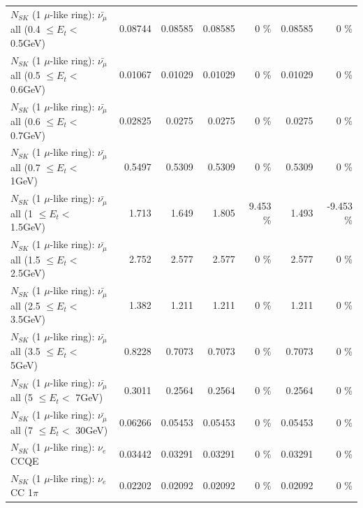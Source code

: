 \begin{table}
\begin{tabular}{| l | r | r | r  r | r  r |}
 $N_{SK}$ (1 $\mu$-like ring): $\bar{\nu_{\mu}}$ all (0.4 $\leq E_{t} <$ 0.5GeV) &         0.08744 &         0.08585 &         0.08585 &        0 \%  &         0.08585 &        0 \%  \\ 
 $N_{SK}$ (1 $\mu$-like ring): $\bar{\nu_{\mu}}$ all (0.5 $\leq E_{t} <$ 0.6GeV) &         0.01067 &         0.01029 &         0.01029 &        0 \%  &         0.01029 &        0 \%  \\ 
 $N_{SK}$ (1 $\mu$-like ring): $\bar{\nu_{\mu}}$ all (0.6 $\leq E_{t} <$ 0.7GeV) &         0.02825 &          0.0275 &          0.0275 &        0 \%  &          0.0275 &        0 \%  \\ 
   $N_{SK}$ (1 $\mu$-like ring): $\bar{\nu_{\mu}}$ all (0.7 $\leq E_{t} <$ 1GeV) &          0.5497 &          0.5309 &          0.5309 &        0 \%  &          0.5309 &        0 \%  \\ 
   $N_{SK}$ (1 $\mu$-like ring): $\bar{\nu_{\mu}}$ all (1 $\leq E_{t} <$ 1.5GeV) &           1.713 &           1.649 &           1.805 &    9.453 \%  &           1.493 &   -9.453 \%  \\ 
 $N_{SK}$ (1 $\mu$-like ring): $\bar{\nu_{\mu}}$ all (1.5 $\leq E_{t} <$ 2.5GeV) &           2.752 &           2.577 &           2.577 &        0 \%  &           2.577 &        0 \%  \\ 
 $N_{SK}$ (1 $\mu$-like ring): $\bar{\nu_{\mu}}$ all (2.5 $\leq E_{t} <$ 3.5GeV) &           1.382 &           1.211 &           1.211 &        0 \%  &           1.211 &        0 \%  \\ 
   $N_{SK}$ (1 $\mu$-like ring): $\bar{\nu_{\mu}}$ all (3.5 $\leq E_{t} <$ 5GeV) &          0.8228 &          0.7073 &          0.7073 &        0 \%  &          0.7073 &        0 \%  \\ 
     $N_{SK}$ (1 $\mu$-like ring): $\bar{\nu_{\mu}}$ all (5 $\leq E_{t} <$ 7GeV) &          0.3011 &          0.2564 &          0.2564 &        0 \%  &          0.2564 &        0 \%  \\ 
    $N_{SK}$ (1 $\mu$-like ring): $\bar{\nu_{\mu}}$ all (7 $\leq E_{t} <$ 30GeV) &         0.06266 &         0.05453 &         0.05453 &        0 \%  &         0.05453 &        0 \%  \\ 
\hline
\hline
\hline
                                      $N_{SK}$ (1 $\mu$-like ring): $\nu_e$ CCQE &         0.03442 &         0.03291 &         0.03291 &        0 \%  &         0.03291 &        0 \%  \\ 
                                 $N_{SK}$ (1 $\mu$-like ring): $\nu_e$ CC 1$\pi$ &         0.02202 &         0.02092 &         0.02092 &        0 \%  &         0.02092 &        0 \%  \\ 

\end{tabular}
\end{table}
